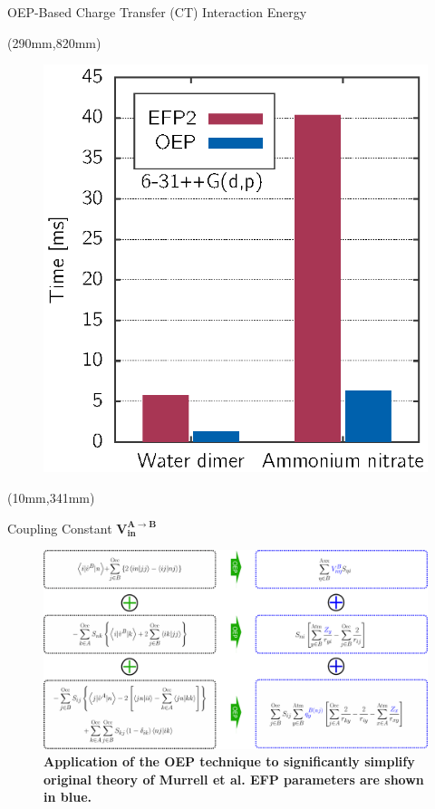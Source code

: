\documentclass[final]{beamer} %
\begin{document}
\begin{frame}{OEP-Based Charge Transfer (CT) Interaction Energy}
\begin{textblock*}{340mm}(290mm,820mm)
\begin{figure}
\includegraphics[width=1.0\textwidth]{fig-2.eps}
\end{figure}
\end{textblock*}


\begin{textblock*}{820mm}(10mm,341mm)
\begin{exampleblock}{Coupling Constant $\boldsymbol{ V_{in}^{A\rightarrow B} } $}
\begin{figure}
\includegraphics[width=1.0\textwidth]{scheme.eps}
\caption{\bf Application of the OEP technique to significantly simplify original theory of Murrell et al. EFP parameters
are shown in blue.}
\end{figure}
\end{exampleblock}
\end{textblock*}


\end{frame}
\end{document}
